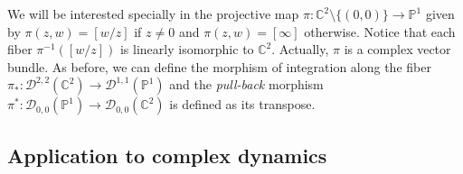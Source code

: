 We will be interested specially in the projective map $\pi: \mathbb{C}^2\setminus\{(0,0)\} \rightarrow \mathbb{P}^1$ given by $\pi(z,w)=[w/z]$ if $z\neq 0$ and $\pi(z,w) = [\infty]$ otherwise. Notice that each fiber $\pi^{-1}([w/z])$ is linearly isomorphic to $\mathbb{C}^2$. Actually, $\pi$ is a complex vector bundle. As before, we can define the morphism of integration along the fiber $\pi_*: \mathcal{D}^{2,2}(\mathbb{C}^2) \rightarrow \mathcal{D}^{1,1}(\mathbb{P}^1)$ and the {\it pull-back} morphism $\pi^*: \mathcal{D}_{0,0}(\mathbb{P}^1) \rightarrow \mathcal{D}_{0,0}(\mathbb{C}^2)$ is defined as its transpose.
%

%
%

\subsection{Application to complex dynamics}\label{sect3}

